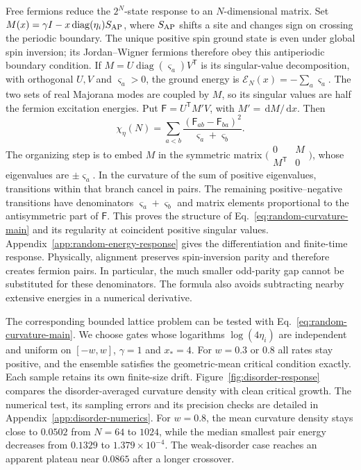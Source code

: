 \documentclass[aps,pre,reprint,amsmath,amssymb,longbibliography,floatfix]{revtex4-2}
\newcommand{\dd}{\,\mathrm d}
\begin{document}
Free fermions reduce the $2^N$-state response to an $N$-dimensional
matrix. Set $M(x)=\gamma I-x\operatorname{diag}(\eta_i)S_{\rm AP}$,
where $S_{\rm AP}$ shifts a site and changes sign on crossing the
periodic boundary. The unique positive spin ground state is even under global spin
inversion; its Jordan--Wigner fermions therefore obey this antiperiodic
boundary condition. If $M=U\operatorname{diag}(\varsigma_a)V^{\mathsf T}$
is its singular-value decomposition, with orthogonal $U,V$ and
$\varsigma_a>0$, the ground energy is
$\mathscr E_N(x)=-\sum_a\varsigma_a$. The two sets of real Majorana
modes are coupled by $M$, so its singular values are half the fermion
excitation energies. Put $\mathsf F=U^{\mathsf T}M'V$, with $M'=\dd M/\dd x$.
Then
\begin{equation}
 \chi_\eta(N)=\sum_{a<b}
 \frac{(\mathsf F_{ab}-\mathsf F_{ba})^2}{\varsigma_a+\varsigma_b}.
 \label{eq:random-curvature-main}
\end{equation}
The organizing step is to embed $M$ in the symmetric matrix
$\bigl(\begin{smallmatrix}0&M\\M^{\mathsf T}&0\end{smallmatrix}\bigr)$,
whose eigenvalues are $\pm\varsigma_a$. In the curvature of the sum
of positive eigenvalues, transitions within that branch cancel in
pairs. The remaining positive--negative transitions have denominators
$\varsigma_a+\varsigma_b$ and matrix elements proportional to the
antisymmetric part of $\mathsf F$. This proves the structure of
Eq.~\eqref{eq:random-curvature-main} and its regularity at coincident
positive singular values. Appendix~\ref{app:random-energy-response}
gives the differentiation and finite-time response. Physically,
alignment preserves spin-inversion parity and therefore creates
fermion pairs. In
particular, the much smaller odd-parity gap cannot be substituted for
these denominators. The formula also avoids subtracting nearby
extensive energies in a numerical derivative.

The corresponding bounded lattice problem can be tested with
Eq.~\eqref{eq:random-curvature-main}. We choose
gates whose logarithms $\log(4\eta_i)$ are independent and uniform on $\left[-w,w\right]$,
$\gamma=1$ and $x_*=4$. For $w=0.3$ or $0.8$ all rates stay positive,
and the ensemble satisfies the geometric-mean critical condition
exactly. Each sample retains its own finite-size drift.
Figure~\ref{fig:disorder-response} compares the disorder-averaged
curvature density with clean critical growth. The numerical test,
its sampling errors and its precision checks are detailed in
Appendix~\ref{app:disorder-numerics}. For $w=0.8$, the mean curvature
density stays close to $0.0502$ from $N=64$ to $1024$, while the median
smallest pair energy decreases from $0.1329$ to $1.379\times10^{-4}$.
The weak-disorder case reaches an apparent plateau near $0.0865$
after a longer crossover.
\end{document}
